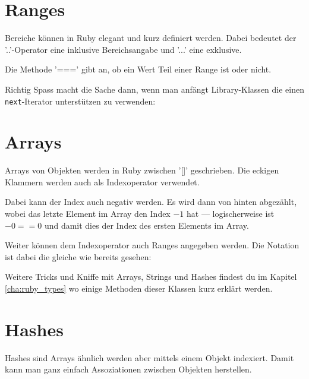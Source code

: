 \documentclass[a4book,11pt,twoside]{scrbook}
\begin{document}








\section{Ranges}
Bereiche können in Ruby elegant und kurz definiert werden. Dabei bedeutet der '..'-Operator eine inklusive Bereichsangabe und '...' eine exklusive.

Die Methode '===' gibt an, ob ein Wert Teil einer Range ist oder nicht.




Richtig Spass macht die Sache dann, wenn man anfängt Library-Klassen die einen \texttt{next}-Iterator unterstützen zu verwenden:







\section{Arrays} %
\label{sec:arrays}
Arrays von Objekten werden in Ruby zwischen '[]' geschrieben. Die eckigen Klammern werden auch als Indexoperator verwendet.

Dabei kann der Index auch negativ werden. Es wird dann von hinten abgezählt, wobei das letzte Element im Array den Index $-1$ hat — logischerweise ist $-0 == 0$ und damit dies der Index des ersten Elements im Array.





Weiter können dem Indexoperator auch Ranges angegeben werden. Die Notation ist dabei die gleiche wie bereits gesehen:




Weitere Tricks und Kniffe mit Arrays, Strings und Hashes findest du im Kapitel \ref{cha:ruby_types} wo einige Methoden dieser Klassen kurz erklärt werden.


\section{Hashes} %
\label{sub:hashes}
Hashes sind Arrays ähnlich werden aber mittels einem Objekt indexiert. Damit kann man ganz einfach Assoziationen zwischen Objekten herstellen.
\end{document}
